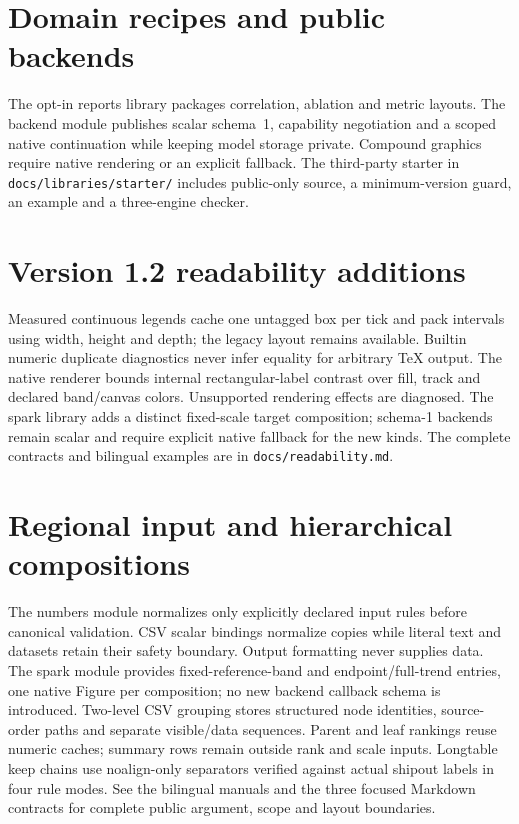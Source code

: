 \section{Domain recipes and public backends}
The opt-in reports library packages correlation, ablation and metric layouts.
The backend module publishes scalar schema~1, capability negotiation and a
scoped native continuation while keeping model storage private. Compound
graphics require native rendering or an explicit fallback. The third-party
starter in \texttt{docs/libraries/starter/} includes public-only source, a
minimum-version guard, an example and a three-engine checker.

\section{Version 1.2 readability additions}
Measured continuous legends cache one untagged box per tick and pack intervals
using width, height and depth; the legacy layout remains available. Builtin
numeric duplicate diagnostics never infer equality for arbitrary TeX output.
The native renderer bounds internal rectangular-label contrast over fill, track
and declared band/canvas colors. Unsupported rendering effects are diagnosed.
The spark library adds a distinct fixed-scale target composition; schema-1
backends remain scalar and require explicit native fallback for the new kinds.
The complete contracts and bilingual examples are in \texttt{docs/readability.md}.

\section{Regional input and hierarchical compositions}
The numbers module normalizes only explicitly declared input rules before
canonical validation. CSV scalar bindings normalize copies while literal text
and datasets retain their safety boundary. Output formatting never supplies data.
The spark module provides fixed-reference-band and endpoint/full-trend entries,
one native Figure per composition; no new backend callback schema is introduced.
Two-level CSV grouping stores structured node identities, source-order paths and
separate visible/data sequences. Parent and leaf rankings reuse numeric caches;
summary rows remain outside rank and scale inputs. Longtable keep chains use
noalign-only separators verified against actual shipout labels in four rule modes.
See the bilingual manuals and the three focused Markdown contracts for complete
public argument, scope and layout boundaries.



